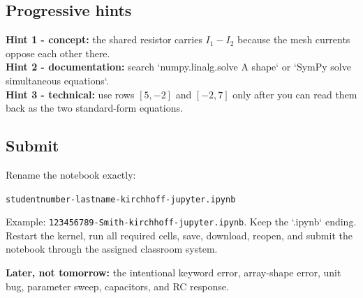 \documentclass[10pt,letterpaper]{article}
\begin{document}
\subsection*{Progressive hints}

\textbf{Hint 1 - concept:} the shared resistor carries $I_1-I_2$ because the mesh currents oppose each other there.\\
\textbf{Hint 2 - documentation:} search `numpy.linalg.solve A shape` or `SymPy solve simultaneous equations`.\\
\textbf{Hint 3 - technical:} use rows $[5,-2]$ and $[-2,7]$ only after you can read them back as the two standard-form equations.

\subsection*{Submit}

Rename the notebook exactly:

\begin{center}
\texttt{studentnumber-lastname-kirchhoff-jupyter.ipynb}
\end{center}

Example: \texttt{123456789-Smith-kirchhoff-jupyter.ipynb}. Keep the `.ipynb` ending. Restart the kernel, run all required cells, save, download, reopen, and submit the notebook through the assigned classroom system.

\textbf{Later, not tomorrow:} the intentional keyword error, array-shape error, unit bug, parameter sweep, capacitors, and RC response.
\end{document}
